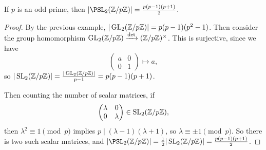 \documentclass[a4paper]{scrartcl}
\begin{document}
\begin{lemma}
	If $p$ is an odd prime, then $|\PSL_2(\Z/p\Z)| = \frac{p(p - 1)(p + 1)}{2}$.
\end{lemma}
\begin{proof}
	By the previous example, $|\operatorname{GL}_2(\mathbb{Z}/p\mathbb{Z})| = p(p-1)(p^2 - 1)$. Then consider the group homomorphism $\operatorname{GL}_2(\mathbb{Z}/p\mathbb{Z}) \xrightarrow{\det} (\mathbb{Z}/p\mathbb{Z})^\times$. This is surjective, since we have
	$$
\begin{pmatrix}
	a & 0 \\
	0 & 1
\end{pmatrix} \longmapsto a,
	$$
	so $|\operatorname{SL}_2(\mathbb{Z}/p\mathbb{Z})| = \frac{|\operatorname{GL}_2(\mathbb{Z}/p\mathbb{Z})|}{p - 1} = p(p - 1)(p + 1)$.

	Then counting the number of scalar matrices, if
	$$
	\begin{pmatrix}
		\lambda & 0 \\ 0 & \lambda
	\end{pmatrix} \in \operatorname{SL}_2(\mathbb{Z}/p\mathbb{Z}),
	$$
	then $\lambda^2 \equiv 1\pmod{p}$ implies $p \mid (\lambda - 1)(\lambda + 1)$, so $\lambda \equiv \pm 1 \pmod{p}$. So there is two such scalar matrices, and $|\PSL_2(\Z/p\Z)| = \frac{1}{2}|\SL_2(\Z/p\Z)| = \frac{p(p - 1)(p + 1)}{2}$.
\end{proof}
\end{document}
